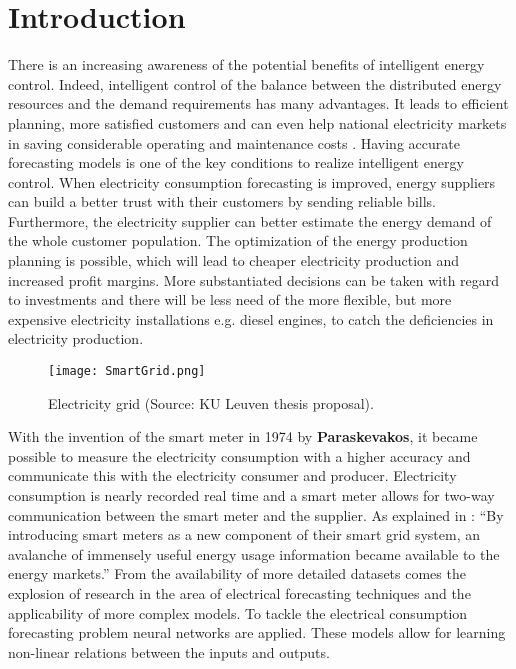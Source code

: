 \chapter{Introduction}
There is an increasing awareness of the potential benefits of intelligent energy control. Indeed, intelligent control
of the balance between the distributed energy resources and the demand requirements has many advantages. It leads to efficient planning, more satisfied customers and can even help national electricity markets in saving considerable operating and maintenance costs \cite{NarjesFallah2018}. Having accurate forecasting models is one of the key conditions to realize intelligent energy control. When electricity consumption forecasting is improved, energy suppliers can build a better trust with their customers by sending reliable bills. Furthermore, the electricity supplier can better estimate the energy demand of the whole customer population. The optimization of the energy production planning is possible, which will lead to cheaper electricity production and increased profit margins. More substantiated decisions can be taken with regard to investments and there will be less need of the more flexible, but more expensive electricity installations e.g. diesel engines, to catch the deficiencies in electricity production.\\

\begin{figure}[h!]
	\centering
	\texttt{[image: SmartGrid.png]}
	\caption{Electricity grid (Source: KU Leuven thesis proposal).}
	\label{fig:power_image}
\end{figure}

With the invention of the smart meter in 1974 by \textbf{Paraskevakos}, it became possible to measure the electricity consumption with a higher accuracy and communicate this with the electricity consumer and producer. Electricity consumption is nearly recorded real time and a smart meter allows for two-way communication between the smart meter and the supplier. As explained in \cite{Depuru2011}: ``By introducing smart meters as a new
component of their smart grid system, an avalanche of immensely useful energy usage information
became available to the energy markets.'' From the availability of more detailed datasets comes the explosion of research in the area of electrical forecasting techniques and the applicability of more complex models. To tackle the electrical consumption forecasting problem neural networks are applied. These models allow for learning non-linear relations between the inputs and outputs.\\

